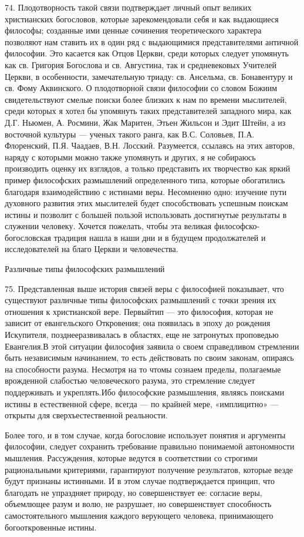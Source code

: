 \documentclass[a5paper,10pt]{article}
\begin{document}
74. Плодотворность такой связи подтверждает личный опыт великих христианских
богословов, которые зарекомендовали себя и как выдающиеся философы; созданные
ими ценные сочинения теоретического характера позволяют нам ставить их в один
ряд с выдающимися представителями античной философии. Это касается как Отцов
Церкви, среди которых следует упомянуть как св. Григория Богослова и св.
Августина, так и средневековых Учителей Церкви, в особенности, замечательную
триаду: св. Ансельма, св. Бонавентуру и св. Фому Аквинского. О плодотворной
связи философии со словом Божиим свидетельствуют смелые поиски более близких к
нам по времени мыслителей, среди которых я хотел бы упомянуть таких
представителей западного мира, как Д.Г. Ньюмен, А. Росмини, Жак Маритен, Этьен
Жильсон и Эдит Штейн, а из восточной культуры — ученых такого ранга, как В.С.
Соловьев, П.А. Флоренский, П.Я. Чаадаев, В.Н. Лосский. Разумеется, ссылаясь на
этих авторов, наряду с которыми можно также упомянуть и других, я не собираюсь
производить оценку их взглядов, а только представить их творчество как яркий
пример философских размышлений определенного типа, которые обогатились
благодаря взаимодействию с истинами веры. Несомненно одно: изучение пути
духовного развития этих мыслителей будет способствовать успешным поискам истины
и позволит с большей пользой использовать достигнутые результаты в служении
человеку. Хочется пожелать, чтобы эта великая философско-богословская традиция
нашла в наши дни и в будущем продолжателей и исследователей на благо Церкви и
человечества.

Различные типы философских размышлений

75. Представленная выше история связей веры с философией показывает, что
существуют различные типы философских размышлений с точки зрения их отношения к
христианской вере. Первыйтип — это философия, которая не зависит от
евангельского Откровения; она появилась в эпоху до рождения Искупителя,
позднееразвивалась в областях, еще не затронутых проповедью Евангелия.В этой
ситуации философия заявила о своем справедливом стремлении быть независимым
начинанием, то есть действовать по своим законам, опираясь на способности
разума. Несмотря на то чтомы сознаем пределы, полагаемые врожденной слабостью
человеческого разума, это стремление следует поддерживать и укреплять.Ибо
философские размышления, являясь поисками истины в естественной сфере, всегда —
по крайней мере, «имплицитно» — открыты для сверхъестественной реальности.

Более того, и в том случае, когда богословие использует понятия и аргументы
философии, следует сохранить требование правильно понимаемой автономности
мышления. Рассуждения, которые ведутся в соответствии со строгими рациональными
критериями, гарантируют получение результатов, которые везде будут признаны
истинными. И в этом случае подтверждается принцип, что благодать не упраздняет
природу, но совершенствует ее: согласие веры, объемлющее разум и волю, не
разрушает, но совершенствует способность самостоятельного мышления каждого
верующего человека, принимающего богооткровенные истины.
\end{document}
